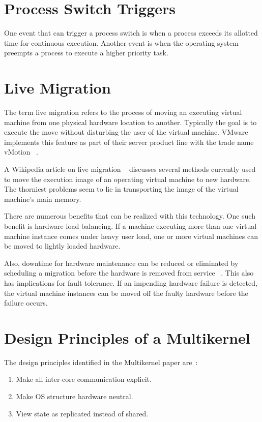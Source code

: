 \documentclass[12pt]{article}
\begin{document}
\section*{Process Switch Triggers}
One event that can trigger a process switch is when a process exceeds
its allotted time for continuous execution.  Another event is when the
operating system preempts a process to execute a higher priority task.

\section*{Live Migration}
The term live migration refers to the process of moving an executing
virtual machine from one physical hardware location to another.
Typically the goal is to execute the move without disturbing the user
of the virtual machine. VMware implements this feature as part of
their server product line with the trade name vMotion ~\cite{vmware}.

A Wikipedia article on live migration ~\cite{wikipedia-migration}
discusses several methods currently used to move the execution image
of an operating virtual machine to new hardware.  The thorniest
problems seem to lie in transporting the image of the virtual
machine's main memory.

There are numerous benefits that can be realized with this technology.
One such benefit is hardware load balancing.  If a machine executing
more than one virtual machine instance comes under heavy user load,
one or more virtual machines can be moved to lightly loaded hardware.

Also, downtime for hardware maintenance can be reduced or eliminated
by scheduling a migration before the hardware is removed from service
~\cite{vmware}.  This also has implications for fault tolerance.  If
an impending hardware failure is detected, the virtual machine
instances can be moved off the faulty hardware before the failure
occurs.

\section*{Design Principles of a Multikernel}
The design principles identified in the Multikernel paper
are~\cite{barrelfish}:
\begin{enumerate}
  \item Make all inter-core communication explicit.
  \item Make OS structure hardware neutral.
  \item View state as replicated instead of shared.
\end{enumerate}
\end{document}
